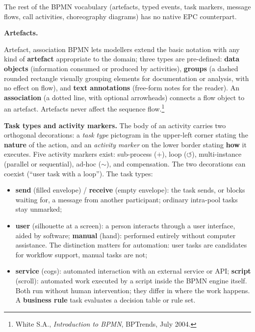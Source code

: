 The rest of the BPMN vocabulary (artefacts, typed events, task markers, message flows, call activities, choreography diagrams) has no native EPC counterpart.

\textbf{Artefacts.}
\begin{definitionbox}{Artefact, association}
BPMN lets modellers extend the basic notation with any kind of \textbf{artefact} appropriate to the domain; three types are pre-defined: \textbf{data objects} (information consumed or produced by activities), \textbf{groups} (a dashed rounded rectangle visually grouping elements for documentation or analysis, with no effect on flow), and \textbf{text annotations} (free-form notes for the reader). An \textbf{association} (a dotted line, with optional arrowheads) connects a flow object to an artefact. Artefacts never affect the sequence flow.\footnote{White S.A., \emph{Introduction to BPMN}, BPTrends, July 2004.}
\end{definitionbox}

\textbf{Task types and activity markers.} The body of an activity carries two orthogonal decorations: a \emph{task type} pictogram in the upper-left corner stating the \textbf{nature} of the action, and an \emph{activity marker} on the lower border stating \textbf{how} it executes. Five activity markers exist: sub-process ($+$), loop ($\circlearrowleft$), multi-instance (parallel or sequential), ad-hoc ($\sim$), and compensation. The two decorations can coexist (``user task with a loop''). The task types:
\begin{itemize}
  \item \textbf{send} (filled envelope) / \textbf{receive} (empty envelope): the task sends, or blocks waiting for, a message from another participant; ordinary intra-pool tasks stay unmarked;
  \item \textbf{user} (silhouette at a screen): a person interacts through a user interface, aided by software; \textbf{manual} (hand): performed entirely without computer assistance. The distinction matters for automation: user tasks are candidates for workflow support, manual tasks are not;
  \item \textbf{service} (cogs): automated interaction with an external service or API; \textbf{script} (scroll): automated work executed by a script inside the BPMN engine itself. Both run without human intervention; they differ in where the work happens. A \textbf{business rule} task evaluates a decision table or rule set.
\end{itemize}

